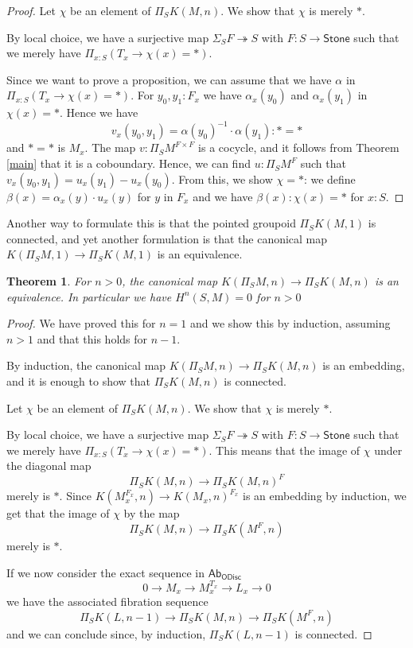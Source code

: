 \documentclass[10pt,a4paper]{article}
\newtheorem{theorem}{Theorem}[section]
\newcommand{\ras}{\twoheadrightarrow}
\newcommand{\Stone}{\mathsf{Stone}}
\newcommand{\OAbG}{\mathsf{Ab_{ODisc}}}
\newcommand{\ra}{\rightarrow}
\newcommand\norm[1]{\left\lVert #1 \right\rVert}
\begin{document}
\begin{proof}
  Let $\chi$ be an element of $\Pi_SK(M,n)$. We show that $\chi$ is merely $*$.

  By local choice, we have
  a surjective map $\Sigma_SF\ras S$ with $F:S\ra\Stone$ such that we merely have
  $\Pi_{x:S}(T_x\ra \chi(x) = *)$.


Since we want to prove a proposition, we can assume that we have $\alpha$ in   $\Pi_{x:S}(T_x\ra \chi(x) = *)$.
For $y_0,y_1:F_x$ we have $\alpha_x(y_0)$ and $\alpha_x(y_1)$ in $\chi(x)=*$.
Hence we have
$$v_x(y_0,y_1) = \alpha(y_0)^{-1}\cdot \alpha(y_1):* = *$$
and $*=*$ is $M_x$.
The map $v:\Pi_{S}M^{F\times F}$ is a cocycle, and it 
follows from Theorem \ref{main} that it is a coboundary. 
Hence, we can find $u:\Pi_{S}M^{F}$ such that $v_x(y_0,y_1) = u_x(y_1)-u_x(y_0)$.
From this, we show $\chi = *$: we define $\beta(x) = \alpha_x(y)\cdot u_x(y)$ for $y$ in $F_x$ and we
have $\beta(x):\chi(x) = *$ for $x:S$.
\end{proof}

Another way to formulate this is that the pointed groupoid $\Pi_SK(M,1)$ is connected, and yet another formulation
is that the canonical map $K(\Pi_SM,1)\ra\Pi_SK(M,1)$ is an equivalence.

\begin{theorem}\label{cohom2}
  For $n>0$, the canonical map $K(\Pi_SM,n)\ra\Pi_SK(M,n)$ is an equivalence.
  In particular we have $H^n(S,M) = 0$ for $n>0$
\end{theorem}

\begin{proof}
  We have proved this for $n=1$ and we show this by induction, assuming $n>1$ and that this holds for $n-1$.

  By induction, the canonical map  $K(\Pi_SM,n)\ra\Pi_SK(M,n)$ is an embedding, and it is enough to show
  that $\Pi_SK(M,n)$ is connected.

  Let $\chi$ be an element of $\Pi_SK(M,n)$. We show that $\chi$ is merely $*$.

  By local choice, we have
  a surjective map $\Sigma_SF\ras S$ with $F:S\ra\Stone$ such that we merely have
  $\Pi_{x:S}(T_x\ra \chi(x) = *)$. This means that the image of $\chi$
  under the diagonal map
  $$
  \Pi_SK(M,n)\ra\Pi_SK(M,n)^F
  $$
  merely is $*$. Since $K(M_x^{F_x},n)\ra K(M_x,n)^{F_x}$ is an embedding by induction,
  we get that the image of $\chi$ by the map
  $$
  \Pi_SK(M,n)\ra\Pi_SK(M^F,n)
  $$
  merely is $*$.

  If we now consider the exact sequence in $\OAbG$
  $$0\ra M_x\ra M_x^{T_x}\ra L_x\ra 0$$
  we have the associated fibration sequence
  $$\Pi_SK(L,n-1)\ra \Pi_SK(M,n)\ra \Pi_SK(M^F,n)$$
  and we can conclude since, by induction, $\Pi_SK(L,n-1)$ is connected.
\end{proof}
\end{document}
